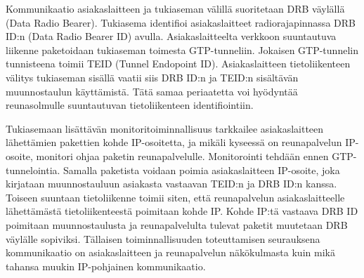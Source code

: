 Kommunikaatio asiakaslaitteen ja tukiaseman välillä suoritetaan DRB väylällä (Data Radio Bearer).
Tukiasema identifioi asiakaslaitteet radiorajapinnassa DRB ID:n (Data Radio Bearer ID) avulla.
Asiakaslaitteelta verkkoon suuntautuva liikenne paketoidaan tukiaseman toimesta GTP-tunneliin. Jokaisen GTP-tunnelin tunnisteena toimii TEID (Tunnel Endopoint ID).
Asiakaslaitteen tietoliikenteen välitys tukiaseman sisällä vaatii siis DRB ID:n ja TEID:n sisältävän muunnostaulun käyttämistä.
Tätä samaa periaatetta voi hyödyntää reunasolmulle suuntautuvan tietoliikenteen identifiointiin.

Tukiasemaan lisättävän monitoritoiminnallisuus tarkkailee asiakaslaitteen lähettämien pakettien kohde IP-osoitetta, ja mikäli kyseessä on reunapalvelun IP-osoite, monitori ohjaa paketin reunapalvelulle.
Monitorointi tehdään ennen GTP-tunnelointia.
Samalla paketista voidaan poimia asiakaslaitteen IP-osoite, joka kirjataan muunnostauluun asiakasta vastaavan TEID:n ja DRB ID:n kanssa.
Toiseen suuntaan tietoliikenne toimii siten, että reunapalvelun asiakaslaitteelle lähettämästä tietoliikenteestä poimitaan kohde IP.
Kohde IP:tä vastaava DRB ID poimitaan muunnostaulusta ja reunapalvelulta tulevat paketit muutetaan DRB väylälle sopiviksi.
Tällaisen toiminnallisuuden toteuttamisen seurauksena kommunikaatio on asiakaslaitteen ja reunapalvelun näkökulmasta kuin mikä tahansa muukin IP-pohjainen kommunikaatio.

